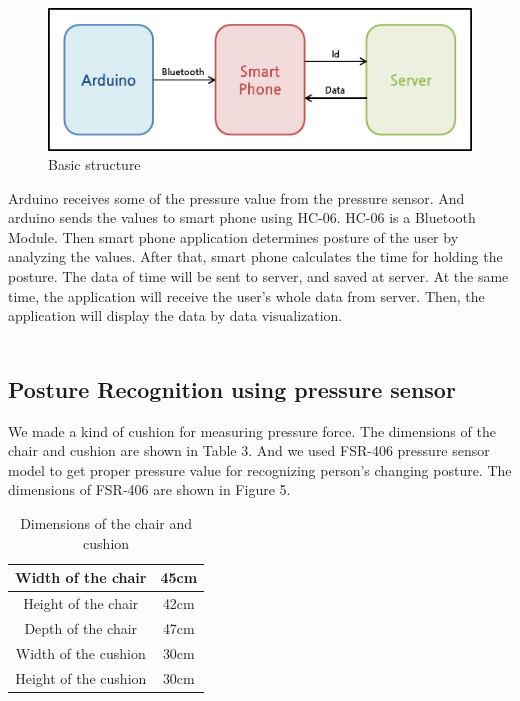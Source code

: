 \documentclass[conference]{IEEEtran}
\begin{document}
\begin{figure}[H]
\begin{center}
    \includegraphics[scale=0.55]{img_04.png}
    \caption{Basic structure} 
\end{center}
\end{figure}


 Arduino receives some of the pressure value from the pressure sensor. And arduino sends the values to smart phone using HC-06. HC-06 is a Bluetooth Module. Then smart phone application determines posture of the user by analyzing the values. After that, smart phone calculates the time for holding the posture. The data of time will be sent to server, and saved at server.
At the same time, the application will receive the user's whole data from server. Then, the application will display the data by data visualization.\\\\

\subsection{Posture Recognition using pressure sensor}
 We made a kind of cushion for measuring pressure force. The dimensions of the chair and cushion are shown in Table 3. And we used FSR-406 pressure sensor model to get proper pressure value for recognizing person's changing posture. The dimensions of FSR-406 are shown in Figure 5.\\
 
 \begin{table}[h]
{\renewcommand\arraystretch{1.25}
\caption{Dimensions of the chair and cushion}
\begin{tabular}{|c|cc}  \hline\hline
Width of the chair& \multicolumn{2}{p{5cm}|}{\raggedright 45cm} \\ \hline
Height of the chair& \multicolumn{2}{p{5cm}|}{\raggedright 42cm} \\ \hline
Depth of the chair& \multicolumn{2}{p{5cm}|}{\raggedright 47cm} \\ \hline
Width of the cushion& \multicolumn{2}{p{5cm}|}{\raggedright 30cm} \\ \hline
Height of the cushion& \multicolumn{2}{p{5cm}|}{\raggedright 30cm} \\ \hline \hline
\end{tabular}}
\end{table}
\end{document}
